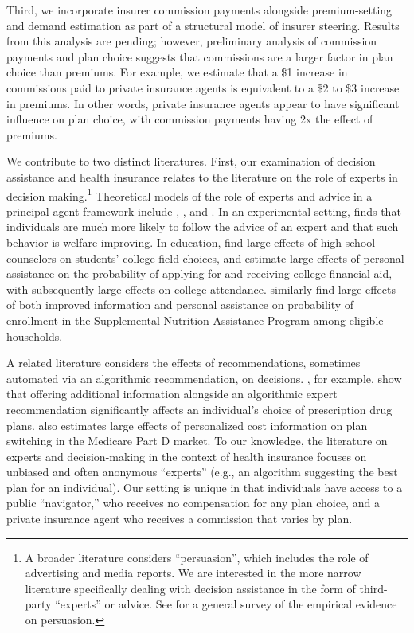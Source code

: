 \documentclass[12pt]{article}
\begin{document}
Third, we incorporate insurer commission payments alongside premium-setting and demand estimation as part of a structural model of insurer steering. Results from this analysis are pending; however, preliminary analysis of commission payments and plan choice suggests that commissions are a larger factor in plan choice than premiums. For example, we estimate that a \$1 increase in commissions paid to private insurance agents is equivalent to a \$2 to \$3 increase in premiums. In other words, private insurance agents appear to have significant influence on plan choice, with commission payments having 2x the effect of premiums.

We contribute to two distinct literatures. First, our examination of decision assistance and health insurance relates to the literature on the role of experts in decision making.\footnote{A broader literature considers ``persuasion'', which includes the role of advertising and media reports. We are interested in the more narrow literature specifically dealing with decision assistance in the form of third-party ``experts'' or advice. See \cite{dellavigna2010} for a general survey of the empirical evidence on persuasion.} Theoretical models of the role of experts and advice in a principal-agent framework include \cite{szalay2005}, \cite{alonzo2008}, and \cite{armstrong2010}. In an experimental setting, \cite{schotter2003} finds that individuals are much more likely to follow the advice of an expert and that such behavior is welfare-improving. In education, \cite{borghans2015} find large effects of high school counselors on students' college field choices, and \cite{bettinger2012} estimate large effects of personal assistance on the probability of applying for and receiving college financial aid, with subsequently large effects on college attendance. \cite{finkelstein2019} similarly find large effects of both improved information and personal assistance on probability of enrollment in the Supplemental Nutrition Assistance Program among eligible households.

A related literature considers the effects of recommendations, sometimes automated via an algorithmic recommendation, on decisions. \cite{bundorf2019}, for example, show that offering additional information alongside an algorithmic expert recommendation significantly affects an individual's choice of prescription drug plans. \cite{kling2012} also estimates large effects of personalized cost information on plan switching in the Medicare Part D market. To our knowledge, the literature on experts and decision-making in the context of health insurance focuses on unbiased and often anonymous ``experts'' (e.g., an algorithm suggesting the best plan for an individual). Our setting is unique in that individuals have access to a public ``navigator,'' who receives no compensation for any plan choice, and a private insurance agent who receives a commission that varies by plan.
\end{document}
